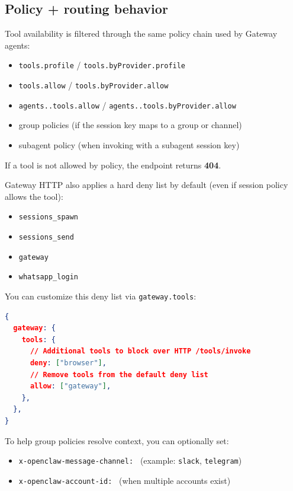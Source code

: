 \subsection{Policy + routing behavior}


Tool availability is filtered through the same policy chain used by Gateway agents:

\begin{itemize}
  \item \texttt{tools.profile} / \texttt{tools.byProvider.profile}
  \item \texttt{tools.allow} / \texttt{tools.byProvider.allow}
  \item \texttt{agents..tools.allow} / \texttt{agents..tools.byProvider.allow}
  \item group policies (if the session key maps to a group or channel)
  \item subagent policy (when invoking with a subagent session key)
\end{itemize}


If a tool is not allowed by policy, the endpoint returns \textbf{404}.

Gateway HTTP also applies a hard deny list by default (even if session policy allows the tool):

\begin{itemize}
  \item \texttt{sessions\_spawn}
  \item \texttt{sessions\_send}
  \item \texttt{gateway}
  \item \texttt{whatsapp\_login}
\end{itemize}


You can customize this deny list via \texttt{gateway.tools}:

\begin{lstlisting}[language=json]
{
  gateway: {
    tools: {
      // Additional tools to block over HTTP /tools/invoke
      deny: ["browser"],
      // Remove tools from the default deny list
      allow: ["gateway"],
    },
  },
}
\end{lstlisting}


To help group policies resolve context, you can optionally set:

\begin{itemize}
  \item \texttt{x-openclaw-message-channel: } (example: \texttt{slack}, \texttt{telegram})
  \item \texttt{x-openclaw-account-id: } (when multiple accounts exist)
\end{itemize}


